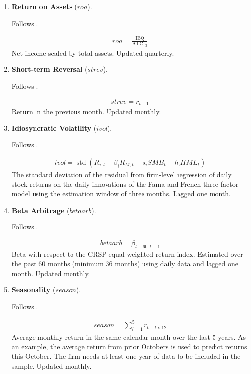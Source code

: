\begin{enumerate}
	
	
	\item \textbf{Return on Assets} ($roa$). 
	
	Follows . 
	
	\begin{align*}
		roa = \frac{ \mathrm{IBQ} }{ \mathrm{ATC}_{-3} }
	\end{align*}
	Net income scaled by total assets. Updated quarterly.
	
	
	
	\item \textbf{Short-term Reversal} ($strev$). 
	
	Follows . 
	
	\begin{align*}
		strev = r_{t-1}
	\end{align*}	
	Return in the previous month. Updated monthly.
	
	
	
	\item \textbf{Idiosyncratic Volatility} ($ivol$). 
	
	Follows . 
	
	\begin{align*}
		ivol = \operatorname{std} \left( R_{i,t} - \beta_i R_{M,t} - s_i SMB_t - h_i HML_t \right)
	\end{align*}
	The standard deviation of the residual from firm-level regression of daily stock returns on the daily innovations of the Fama and French three-factor model using the estimation window of three months. Lagged one month.
	


	\item \textbf{Beta Arbitrage} ($betaarb$). 
	
	Follows . 
	
	\begin{align*}
		betaarb = \beta_{t-60:t-1}
	\end{align*}
	Beta with respect to the CRSP equal-weighted return index. Estimated over the past 60 months (minimum 36 months) using daily data and lagged one month. Updated monthly.
	
	
		
	\item \textbf{Seasonality} ($season$). 
	
	Follows . 
	
	\begin{align*}
		season = \sum_{l=1}^5 r_{t-l\operatorname{x}12}
	\end{align*}
	Average monthly return in the same calendar month over the last 5 years. As an example, the average return from prior Octobers is used to predict returns this October. The firm needs at least one year of data to be included in the sample. Updated monthly.
	

\end{enumerate}
